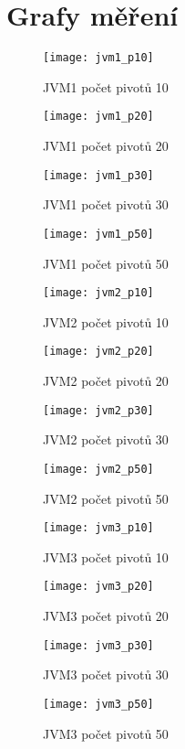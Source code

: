 \chapter{Grafy měření\label{ape:graphs}}
\begin{figure}[h]
\centering
\texttt{[image: jvm1\_p10]}
\caption{JVM1 počet pivotů 10}
\label{fig:jvm1p10}
\end{figure}
\begin{figure}[h]
\texttt{[image: jvm1\_p20]}
\caption{JVM1 počet pivotů 20}
\label{fig:jvm1p20}
\end{figure}

\begin{figure}[h]
\centering
\texttt{[image: jvm1\_p30]}
\caption{JVM1 počet pivotů 30}
\label{fig:jvm1p30}
\end{figure}
\begin{figure}[h]
\centering
\texttt{[image: jvm1\_p50]}
\caption{JVM1 počet pivotů 50}
\label{fig:jvm1p50}
\end{figure}

\begin{figure}[h]
\centering
\texttt{[image: jvm2\_p10]}
\caption{JVM2 počet pivotů 10}
\label{fig:jvm2p10}
\end{figure}

\begin{figure}[h]
\centering
\texttt{[image: jvm2\_p20]}
\caption{JVM2 počet pivotů 20}
\label{fig:jvm2p20}
\end{figure}
\begin{figure}[h]
\centering
\texttt{[image: jvm2\_p30]}
\caption{JVM2 počet pivotů 30}
\label{fig:jvm2p30}
\end{figure}
\begin{figure}[h]
\centering
\texttt{[image: jvm2\_p50]}
\caption{JVM2 počet pivotů 50}
\label{fig:jvm2p50}
\end{figure}

\begin{figure}[h]
\centering
\texttt{[image: jvm3\_p10]}
\caption{JVM3 počet pivotů 10}
\label{fig:jvm3p10}
\end{figure}
\begin{figure}[h]
\centering
\texttt{[image: jvm3\_p20]}
\caption{JVM3 počet pivotů 20}
\label{fig:jvm3p20}
\end{figure}

\begin{figure}[h]
\centering
\texttt{[image: jvm3\_p30]}
\caption{JVM3 počet pivotů 30}
\label{fig:jvm3p30}
\end{figure}
\begin{figure}[h]
\centering
\texttt{[image: jvm3\_p50]}
\caption{JVM3 počet pivotů 50}
\label{fig:jvm3p50}
\end{figure}

